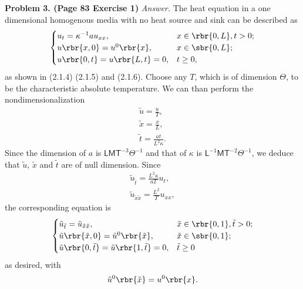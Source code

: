 \documentclass[english, nochinese]{pnote}
\begin{document}
\textbf{Problem 3. (Page 83 Exercise 1)} \textit{Answer.} The heat equation in a one dimensional homogenous media with no heat source and sink can be described as
\begin{equation}
\begin{cases}
u_t = \kappa^{-1} a u_{ x x }, & x \in \rbr{ 0, L }, t > 0; \\
u \rbr{ x, 0 } = u^0 \rbr{x}, & x \in \sbr{ 0, L }; \\
u \rbr{ 0, t } = u \rbr{ L, t } = 0, & t \ge 0,
\end{cases}
\end{equation}
as shown in (2.1.4) (2.1.5) and (2.1.6). Choose any $T$, which is of dimension $\mathsf{\Theta}$, to be the characteristic absolute temperature. We can than perform the nondimensionalization
\begin{gather}
\tilde{u} = \frac{u}{T}, \\
\tilde{x} = \frac{x}{L}, \\
\tilde{t} = \frac{ a t }{ L^2 \kappa }.
\end{gather}
Since the dimension of $a$ is $ \mathsf{L} \mathsf{M} \mathsf{T}^{-3} \mathsf{\Theta}^{-1} $ and that of $\kappa$ is $ \mathsf{L}^{-1} \mathsf{M} \mathsf{T}^{-2} \mathsf{\Theta}^{-1} $, we deduce that $\tilde{u}$, $\tilde{x}$ and $\tilde{t}$ are of null dimension. Since
\begin{gather}
\tilde{u}_{\tilde{t}} = \frac{ L^2 \kappa }{ a T } u_t, \\
\tilde{u}_{ \tilde{x} \tilde{x} } = \frac{ L^2 }{T} u_{ x x },
\end{gather}
the corresponding equation is
\begin{equation}
\begin{cases}
\tilde{u}_{\tilde{t}} = \tilde{u}_{ \tilde{x} \tilde{x} }, & \tilde{x} \in \rbr{ 0, 1 }, \tilde{t} > 0; \\
\tilde{u} \rbr{ \tilde{x}, 0 } = \tilde{u}^0 \rbr{\tilde{x}}, & \tilde{x} \in \sbr{ 0, 1 }; \\
\tilde{u} \rbr{ 0, \tilde{t} } = \tilde{u} \rbr{ 1, \tilde{t} } = 0, & \tilde{t} \ge 0
\end{cases}
\end{equation}
as desired, with
\begin{equation}
\tilde{u}^0 \rbr{\tilde{x}} = u^0 \rbr{x}.
\end{equation}
\end{document}

